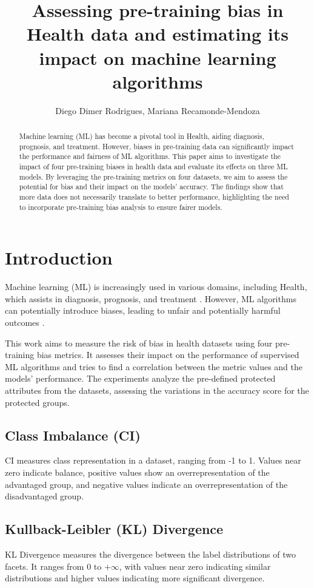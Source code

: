 \documentclass[12pt]{article}
\title{Assessing pre-training bias in Health data and estimating its impact on machine learning algorithms}
\author{Diego Dimer Rodrigues\inst{1}, Mariana Recamonde-Mendoza\inst{1}}
\begin{document}
 

\maketitle

\begin{abstract}
  Machine learning (ML) has become a pivotal tool in Health, aiding diagnosis, prognosis, and treatment. However, biases in pre-training data can significantly impact the performance and fairness of ML algorithms. This paper aims to investigate the impact of four pre-training biases in health data and evaluate its effects on three ML models. By leveraging the pre-training metrics on four datasets, we aim to assess the potential for bias and their impact on the models' accuracy. The findings show that more data does not necessarily translate to better performance, highlighting the need to incorporate pre-training bias analysis to ensure fairer models.
\end{abstract}
     
\section{Introduction}
Machine learning (ML) is increasingly used in various domains, including Health, which assists in diagnosis, prognosis, and treatment \cite{Chen2021}. 
However, ML algorithms can potentially introduce biases, leading to unfair and potentially harmful outcomes \cite{obermeyer2019dissecting,juhn2022assessing}. 

This work aims to measure the risk of bias in health datasets using four pre-training bias metrics. It assesses their impact on the performance of supervised ML algorithms and tries to find a correlation between the metric values and the models' performance. The experiments analyze the pre-defined protected attributes from the datasets, assessing the variations in the accuracy score for the protected groups.

\subsection{Class Imbalance (CI)}
CI measures class representation in a dataset, ranging from -1 to 1. Values near zero indicate balance, positive values show an overrepresentation of the advantaged group, and negative values indicate an overrepresentation of the disadvantaged group.

\subsection{Kullback-Leibler (KL) Divergence}
KL Divergence measures the divergence between the label distributions of two facets. It ranges from 0 to $+\infty$, with values near zero indicating similar distributions and higher values indicating more significant divergence.
\end{document}
